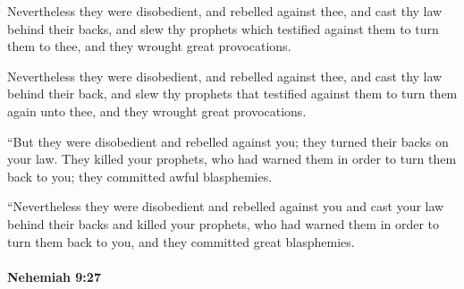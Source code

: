 			Nevertheless they were disobedient, and rebelled against thee, and cast thy law behind their backs, and slew thy prophets which testified against them to turn them to thee, and they wrought great provocations.

			\begin{versebox}
					\item[BHS] 
					\item[LXX] 
					\item[ASV] Nevertheless they were disobedient, and rebelled against thee, and cast thy law behind their back, and slew thy prophets that testified against them to turn them again unto thee, and they wrought great provocations.
					\item[NIV] “But they were disobedient and rebelled against you; they turned their backs on your law. They killed your prophets, who had warned them in order to turn them back to you; they committed awful blasphemies.
					\item[NRSV] “Nevertheless they were disobedient and rebelled against you and cast your law behind their backs and killed your prophets, who had warned them in order to turn them back to you, and they committed great blasphemies.
			\end{versebox}

		\paragraph{Nehemiah 9:27} %
			\label{NEHEMIAH-9-27}

